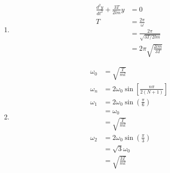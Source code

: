 \documentclass{article}
\begin{document}
\begin{enumerate}
  \item

        \begin{align*}
          \frac{d^2 y}{d t^2} + \frac{3 T}{2 l m} y & = 0                                \\
          T                                         & = \frac{2 \pi}{\omega}             \\
                                                    & = \frac{2 \pi}{\sqrt{3 T / 2 l m}} \\
                                                    & = 2 \pi \sqrt{\frac{2 l m}{3 T}}
        \end{align*}

        \setcounter{enumi}{2}
  \item

        \begin{align*}
          \omega_0 & = \sqrt{\frac{T}{m l}}                                   \\
          \omega_n & = 2 \omega_0 \sin \left[ \frac{n \pi}{2 (N + 1)} \right] \\
          \omega_1 & = 2 \omega_0 \sin \left( \frac{\pi}{6} \right)           \\
                   & = \omega_0                                               \\
                   & = \sqrt{\frac{T}{m l}}                                   \\
          \omega_2 & = 2 \omega_0 \sin \left( \frac{\pi}{3} \right)           \\
                   & = \sqrt{3} \omega_0                                      \\
                   & = \sqrt{\frac{3 T}{m l}}
        \end{align*}
\end{enumerate}

\setcounter{subsection}{14}
\subsection{}
\end{document}
